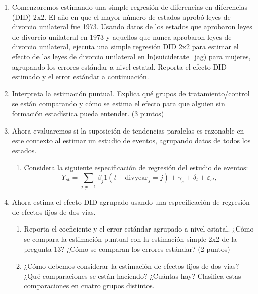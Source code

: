 \documentclass[11pt,a4paper,english]{article}
\begin{document}
\begin{enumerate}
    \item Comenzaremos estimando una simple regresión de diferencias en diferencias (DID) 2x2. El año en que el mayor número de estados aprobó leyes de divorcio unilateral fue 1973. Usando datos de los estados que aprobaron leyes de divorcio unilateral en 1973 y aquellos que nunca aprobaron leyes de divorcio unilateral, ejecuta una simple regresión DID 2x2 para estimar el efecto de las leyes de divorcio unilateral en ln(suiciderate\_jag) para mujeres, agrupando los errores estándar a nivel estatal. Reporta el efecto DID estimado y el error estándar a continuación.
    
    \item Interpreta la estimación puntual. Explica qué grupos de tratamiento/control se están comparando y cómo se estima el efecto para que alguien sin formación estadística pueda entender. (3 puntos)
    
    \item Ahora evaluaremos si la suposición de tendencias paralelas es razonable en este contexto al estimar un estudio de eventos, agrupando datos de todos los estados.
    \begin{enumerate}
        \item Considera la siguiente especificación de regresión del estudio de eventos: \begin{equation}\label{eq:event}
              Y_{st} = \sum_{j \neq \mathbf{-1}} \beta_j 1(t - \text{divyear}_{s} = j) + \gamma_s + \delta_t + \varepsilon_{st}, 
        \end{equation}
    \end{enumerate}

    \item Ahora estima el efecto DID agrupado usando una especificación de regresión de efectos fijos de dos vías.
    \begin{enumerate}
        \item Reporta el coeficiente y el error estándar agrupado a nivel estatal. ¿Cómo se compara la estimación puntual con la estimación simple 2x2 de la pregunta 13? ¿Cómo se comparan los errores estándar? (2 puntos)
        
        \item ¿Cómo debemos considerar la estimación de efectos fijos de dos vías? ¿Qué comparaciones se están haciendo? ¿Cuántas hay? Clasifica estas comparaciones en cuatro grupos distintos.
    \end{enumerate}
\end{enumerate}
\end{document}
